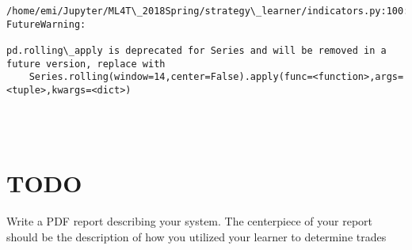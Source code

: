 \documentclass[11pt]{article}
\begin{document}
    \begin{Verbatim}[commandchars=\\\{\}]
/home/emi/Jupyter/ML4T\_2018Spring/strategy\_learner/indicators.py:100: FutureWarning:

pd.rolling\_apply is deprecated for Series and will be removed in a future version, replace with 
	Series.rolling(window=14,center=False).apply(func=<function>,args=<tuple>,kwargs=<dict>)


    \end{Verbatim}

    \begin{center}
    \end{center}
    { \hspace*{\fill} \\}
    
    \section{TODO}\label{todo}

Write a PDF report describing your system. The centerpiece of your
report should be the description of how you utilized your learner to
determine trades


    
    
    
    
\end{document}
